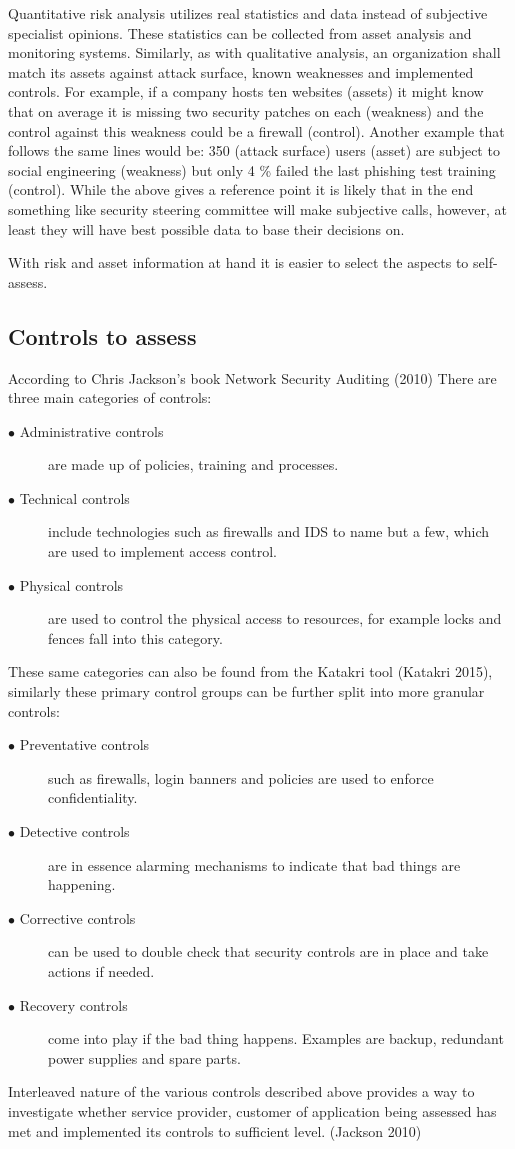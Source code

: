 \documentclass{article}
\begin{document}
\par
Quantitative risk analysis utilizes real statistics and data instead of subjective specialist opinions. These statistics can be collected from asset analysis and monitoring systems.
Similarly, as with qualitative analysis, an organization shall match its assets against attack surface, known weaknesses and implemented controls. For example, if a company hosts ten websites (assets) it might know that on average it is missing two security patches on each (weakness) and the control against this weakness could be a firewall (control). Another example that follows the same lines would be: 350 (attack surface) users (asset) are subject to social engineering (weakness) but only 4 \% failed the last phishing test training (control).
While the above gives a reference point it is likely that in the end something like security steering committee will make subjective calls, however, at least they will have best possible data to base their decisions on.
\par
With risk and asset information at hand it is easier to select the aspects to self-assess. 
\subsection{Controls to assess}
According to Chris Jackson's book Network Security Auditing (2010) There are three main categories of controls:
\begin{description}
	\item[$\bullet$ Administrative controls] are made up of policies, training and processes.
	\item[$\bullet$ Technical controls] include technologies such as firewalls and IDS to name but a few, which are used to implement access control.
	\item[$\bullet$ Physical controls] are used to control the physical access to resources, for example locks and fences fall into this category.
\end{description}
These same categories can also be found from the Katakri tool (Katakri 2015), similarly these primary control groups can be further split into more granular controls:
\begin{description}
	\item[$\bullet$ Preventative controls] such as firewalls, login banners and policies are used to enforce confidentiality.
	\item[$\bullet$ Detective controls] are in essence alarming mechanisms to indicate that bad things are happening.
	\item[$\bullet$ Corrective controls] can be used to double check that security controls are in place and take actions if needed.
	\item[$\bullet$ Recovery controls] come into play if the bad thing happens. Examples are backup, redundant power supplies and spare parts.
\end{description}
Interleaved nature of the various controls described above provides a way to investigate whether service provider, customer of application being assessed has met and implemented its controls to sufficient level. (Jackson 2010)
\break
\end{document}
